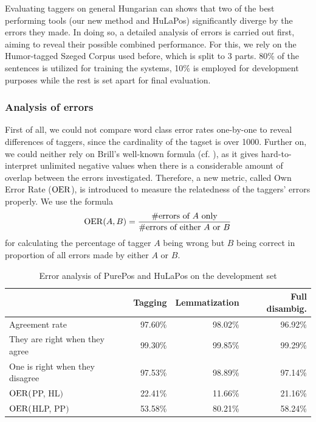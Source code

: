 Evaluating taggers on general Hungarian can shows that two of the best performing tools (our new method and HuLaPos) significantly diverge by the errors they made.
In doing so, a detailed analysis of errors is carried out first, aiming to reveal their possible combined performance.
For this, we rely on the Humor-tagged Szeged Corpus used before, which is split to 3 parts.
80\% of the sentences is utilized for training the systems, 10\% is employed for development purposes while the rest is set apart for final evaluation.

\subsubsection{Analysis of errors}

First of all, we could not compare word class error rates one-by-one to reveal differences of taggers, since the cardinality of the tagset is over 1000.
Further on, we could neither rely on Brill's well-known formula (cf. \cite{Brill1998}), as it gives hard-to-interpret unlimited negative values when there is a considerable amount of overlap between the errors investigated.
Therefore, a new metric, called Own Error Rate ($\operatorname{OER}$), is introduced to measure the relatedness of the taggers' errors properly.
We use the formula 
\begin{equation}
\operatorname{OER}(A,B)=\frac{\text{\#errors of }A\text{ only}}{\text{\#errors of either }A\text{ or }B}
\end{equation}
for calculating the percentage of tagger $A$ being wrong but $B$ being correct in proportion of all errors made by either $A$ or $B$.

\begin{table}[h]
\centering
\caption{Error analysis of PurePos and HuLaPos on the development set}\label{tab:comb-disambig-comp}
\begin{tabular}{l r r r}
\hline
& Tagging & Lemmatization & Full disambig. \\
\hline

Agreement rate & 97.60\% & 98.02\% & 96.92\% \\
They are right when they agree & 99.30\% & 99.85\% & 99.29\% \\
One is right when they disagree & 97.53\% & 98.89\% & 97.14\% \\
$\operatorname{OER}($PP, HL$)$ & 22.41\% & 11.66\% & 21.16\% \\
$\operatorname{OER}($HLP, PP$)$ & 53.58\% & 80.21\% & 58.24\% \\
\hline
\end{tabular}
\end{table}

